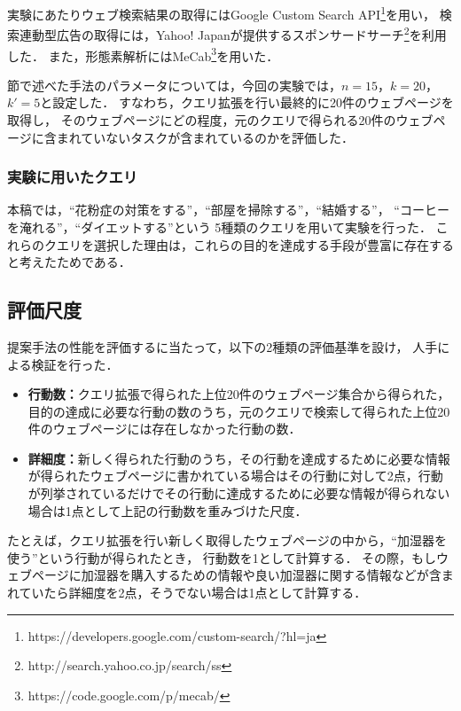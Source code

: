\documentclass[submit,techreq]{ipsj}
\begin{document}
実験にあたりウェブ検索結果の取得にはGoogle Custom Search API\footnote{https://developers.google.com/custom-search/?hl=ja}を用い，
検索連動型広告の取得には，Yahoo! Japanが提供するスポンサードサーチ\footnote{http://search.yahoo.co.jp/search/ss}を利用した．
また，形態素解析にはMeCab\footnote{https://code.google.com/p/mecab/}を用いた．

\label{sec:flow}節で述べた手法のパラメータについては，今回の実験では，$n=15$，$k=20$，$k'=5$と設定した．
すなわち，クエリ拡張を行い最終的に20件のウェブページを取得し，
そのウェブページにどの程度，元のクエリで得られる20件のウェブページに含まれていないタスクが含まれているのかを評価した．


\subsubsection{実験に用いたクエリ}

本稿では，``花粉症の対策をする''，``部屋を掃除する''，``結婚する''，
``コーヒーを淹れる''，``ダイエットする''という
5種類のクエリを用いて実験を行った．
これらのクエリを選択した理由は，これらの目的を達成する手段が豊富に存在すると考えたためである．

\subsection{評価尺度}
提案手法の性能を評価するに当たって，以下の2種類の評価基準を設け，
人手による検証を行った．

\begin{itemize}
\item \textbf{行動数：}クエリ拡張で得られた上位20件のウェブページ集合から得られた，目的の達成に必要な行動の数のうち，元のクエリで検索して得られた上位20件のウェブページには存在しなかった行動の数．
\item \textbf{詳細度：}新しく得られた行動のうち，その行動を達成するために必要な情報が得られたウェブページに書かれている場合はその行動に対して2点，行動が列挙されているだけでその行動に達成するために必要な情報が得られない場合は1点として上記の行動数を重みづけた尺度．
\end{itemize}

たとえば，クエリ拡張を行い新しく取得したウェブページの中から，``加湿器を使う''という行動が得られたとき，
行動数を1として計算する．
その際，もしウェブページに加湿器を購入するための情報や良い加湿器に関する情報などが含まれていたら詳細度を2点，そうでない場合は1点として計算する．



\end{document}
